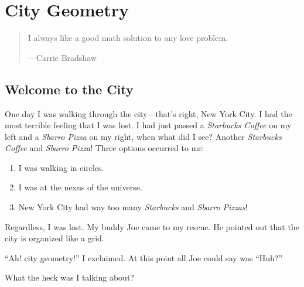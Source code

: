 \chapter{City Geometry}
\begin{quote} 
I always like a good math solution to any love problem.

\hfill---Carrie Bradshaw
%
%
\end{quote}




\section{Welcome to the City}


One day I was walking through the city---that's right, New York City. I
had the most terrible feeling that I was lost. I had just passed a
\textit{Starbucks Coffee} on my left and a \textit{Sbarro Pizza} on my
right, when what did I see? Another \textit{Starbucks Coffee} and
\textit{Sbarro Pizza}! Three options occurred to me:
\begin{enumerate}
\item I was walking in circles.
\item I was at the nexus of the universe.
\item New York City had way too many \textit{Starbucks} and \textit{Sbarro Pizzas}!
\end{enumerate}
Regardless, I was lost. My buddy Joe came to my rescue. He pointed out that the city is organized like a grid. 

``Ah! city geometry!'' I exclaimed. At this point all Joe could say was
``Huh?''


\begin{ques} What the heck was I talking about?
\end{ques}

